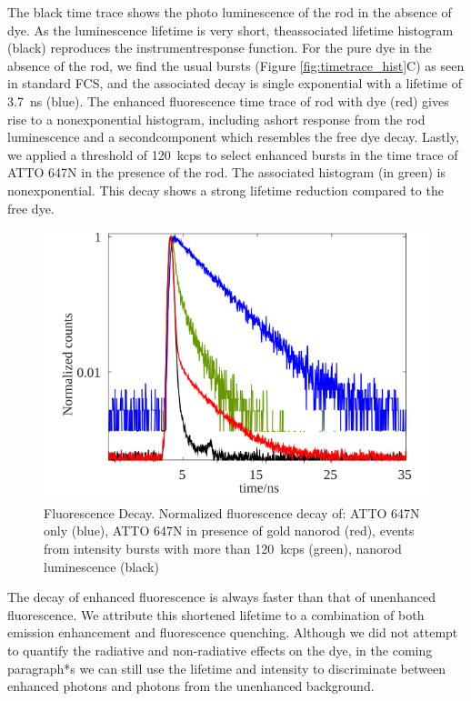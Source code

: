 The black time trace shows the photo luminescence of the rod in the absence of dye.
As the luminescence lifetime is very short, theassociated lifetime histogram (black) reproduces the instrumentresponse function.
For the pure dye in the absence of the rod, we find the usual bursts (Figure \ref{fig:timetrace_hist}C) as seen in standard FCS, and the associated decay is single exponential with a lifetime of \SI{3.7}{\ns} (blue).
The enhanced fluorescence time trace of rod with dye (red) gives rise to a nonexponential histogram, including ashort response from the rod luminescence and a secondcomponent which resembles the free dye decay.
Lastly, we applied a threshold of \SI{120}{kcps} to select enhanced bursts in the time trace of ATTO 647N in the presence of the rod.
The associated histogram (in green) is nonexponential.
This decay shows a strong lifetime reduction compared to the free dye.
\begin{figure}
	\centering
	\includegraphics[]{lifetime_enhnc}
	\caption{Fluorescence Decay. Normalized fluorescence decay of: ATTO 647N only (blue), ATTO 647N in presence of gold nanorod (red), events from intensity bursts with more than \SI{120}{kcps} (green), nanorod luminescence (black)}
	\label{fig:lifetime_enhnc}
\end{figure}
The decay of enhanced fluorescence is always faster than that of unenhanced fluorescence.
We attribute this shortened lifetime to a combination of both emission enhancement and fluorescence quenching.
Although we did not attempt to quantify the radiative and non-radiative effects on the dye, in the coming paragraph*s we can still use the lifetime and intensity to discriminate between enhanced photons and photons from the unenhanced background.

